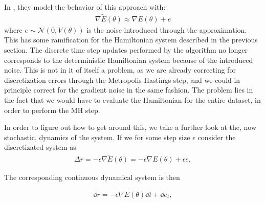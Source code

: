 In \cite{chen_stochastic_2014}, they model the behavior of this approach with:
\begin{align*}
    \nabla\tilde{E}(\theta) \approx \nabla{E}(\theta) + e
\end{align*}
where $e \sim \mathcal{N}(0, V(\theta))$ is the noise introduced through the approximation. This has some ramification for the Hamiltonian system described in the previous section. 
The discrete time step updates performed by the algorithm no longer corresponds to the deterministic Hamiltonian system because of the introduced noise. 
This is not in it of itself a problem, as we are already correcting for discretization errors through the Metropolis-Hastings step, and we could in principle correct for the gradient noise in the same fashion.
The problem lies in the fact that we would have to evaluate the Hamiltonian for the entire dataset, in order to perform the MH step.

In order to figure out how to get around this, we take a further look at the, now stochastic, dynamics of the system. If we for some step size $\epsilon$ consider the discretizated system as
\begin{align*}
\Delta r =  -\epsilon\nabla{\tilde{E}}(\theta) = -\epsilon\nabla{E}(\theta)  + \epsilon e,
\end{align*}

The corresponding continuous dynamical system is then 

\begin{align*}
    \dd{r} = -\epsilon\nabla{E}(\theta)\dd{t}  + \dd{e_t},
\end{align*}
    

